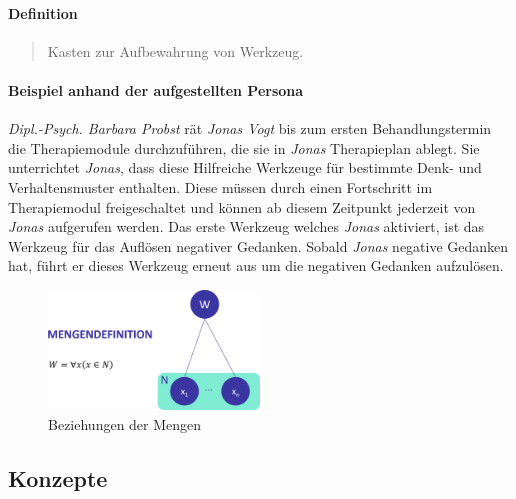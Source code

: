 \paragraph{Definition}
\begin{quote}
Kasten zur Aufbewahrung von Werkzeug. \cite{DudenWer23:online}
\end{quote}

\paragraph{Beispiel anhand der aufgestellten Persona}
\emph{Dipl.-Psych. Barbara Probst} rät \emph{Jonas Vogt} bis zum ersten Behandlungstermin die Therapiemodule durchzuführen, die sie in \emph{Jonas} Therapieplan ablegt. Sie unterrichtet \emph{Jonas}, dass diese Hilfreiche Werkzeuge für bestimmte Denk- und Verhaltensmuster enthalten. Diese müssen durch einen Fortschritt im Therapiemodul freigeschaltet und können ab diesem Zeitpunkt jederzeit von \emph{Jonas} aufgerufen werden. Das erste Werkzeug welches \emph{Jonas} aktiviert, ist das Werkzeug für das Auflösen negativer Gedanken. Sobald \emph{Jonas} negative Gedanken hat, führt er dieses Werkzeug erneut aus um die negativen Gedanken aufzulösen.

\begin{figure}[h]
\centering
\includegraphics[width=0.5\textwidth]{pictures/toolboxdef}
\caption{Beziehungen der Mengen}
\label{therapiedef}
\end{figure}



\subsection{Konzepte}

